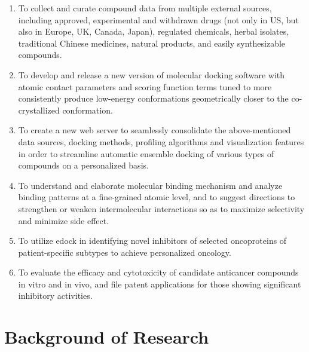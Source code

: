 \documentclass[a4paper,12pt]{article}
\begin{document}
\begin{enumerate}
  \item To collect and curate compound data from multiple external sources, including approved, experimental and withdrawn drugs (not only in US, but also in Europe, UK, Canada, Japan), regulated chemicals, herbal isolates, traditional Chinese medicines, natural products, and easily synthesizable compounds.\label{objective:cdata}
  \item To develop and release a new version of molecular docking software with atomic contact parameters and scoring function terms tuned to more consistently produce low-energy conformations geometrically closer to the co-crystallized conformation.\label{objective:idock}
  \item To create a new web server to seamlessly consolidate the above-mentioned data sources, docking methods, profiling algorithms and visualization features in order to streamline automatic ensemble docking of various types of compounds on a personalized basis.\label{objective:edock}
  \item To understand and elaborate molecular binding mechanism and analyze binding patterns at a fine-grained atomic level, and to suggest directions to strengthen or weaken intermolecular interactions so as to maximize selectivity and minimize side effect.\label{objective:iview}
  \item To utilize edock in identifying novel inhibitors of selected oncoproteins of patient-specific subtypes to achieve personalized oncology.\label{objective:edockapp}
  \item To evaluate the efficacy and cytotoxicity of candidate anticancer compounds in vitro and in vivo, and file patent applications for those showing significant inhibitory activities.\label{objective:wetval}
\end{enumerate}

\section*{Background of Research}
\end{document}
